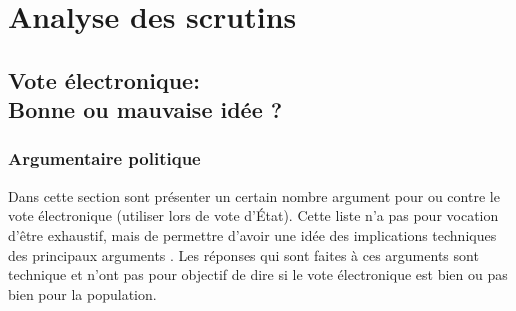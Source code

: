 \documentclass[../report]{subfiles}
\begin{document}
\newcommand\tabcritere[8]{
  \begin{center}
    \begin{tabular}{p{8em}|c|p{28em}}
      \hline
      Critère & Évaluation & Raison \\
      \hline
      \hline
      Avis des perdants & #1 & #2 \\
      \hline
      Indépendance aux petits candidats & #3 & #4 \\
      \hline
      Quasi unanimité du vote & #5 & #6 \\
      \hline
      Manipulabilité & #7 & #8 \\
      \hline
    \end{tabular}
  \end{center}
}



\part{Analyse des scrutins}

\chapter[Vote électronique: bonne ou mauvaise idée ?]{Vote électronique:\\Bonne ou mauvaise idée ?}

\section{Argumentaire politique}

Dans cette section sont présenter un certain nombre argument pour ou contre le vote 
électronique (utiliser lors de vote d'État). 
Cette liste n'a pas pour vocation d'être exhaustif, mais de permettre d'avoir une idée
des implications techniques des principaux arguments \cite{olivier_elections_2022,jaberg_10_nodate}.
Les réponses qui sont faites à ces arguments sont technique et n'ont pas pour objectif de dire si 
le vote électronique est bien ou pas bien pour la population.
\end{document}
